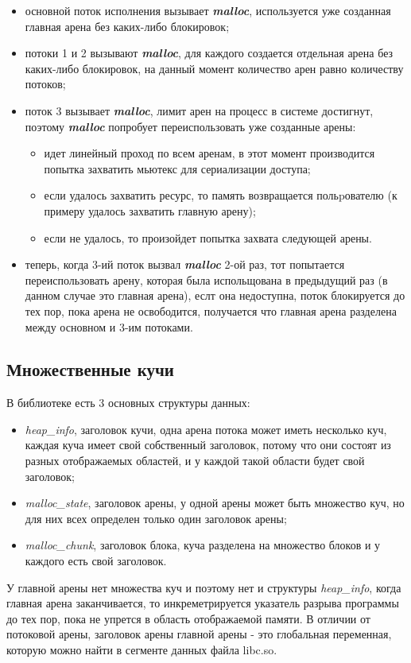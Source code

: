 \begin{itemize}
	\item основной поток исполнения вызывает \textbf{\textit{malloc}}, используется уже созданная главная арена без каких-либо блокировок;
	\item потоки 1 и 2 вызывают \textbf{\textit{malloc}}, для каждого создается отдельная арена без каких-либо блокировок, на данный момент количество арен равно количеству потоков;
	\item поток 3 вызывает \textbf{\textit{malloc}}, лимит арен на процесс в системе достигнут, поэтому \textbf{\textit{malloc}} попробует переиспользовать уже созданные арены:
	\begin{itemize}
		\item идет линейный проход по всем аренам, в этот момент производится попытка захватить мьютекс для сериализации доступа;
		\item если удалось захватить ресурс, то память возвращается польpователю (к примеру удалось захватить главную арену);
		\item если не удалось, то произойдет попытка захвата следующей арены.
	\end{itemize}
	\item теперь, когда 3-ий поток вызвал \textbf{\textit{malloc}} 2-ой раз, тот попытается переиспользовать арену, которая была испольщована в предыдущий раз (в данном случае это главная арена), еслт она недоступна, поток блокируется до тех пор, пока арена не освободится, получается что главная арена разделена между основном и 3-им потоками.
\end{itemize}

\subsection{Множественные кучи}
В библиотеке есть 3 основных структуры данных:
\begin{itemize}
	\item \textit{heap\_info}, заголовок кучи, одна арена потока может иметь несколько куч, каждая куча имеет свой собственный заголовок, потому что они состоят из разных отображаемых областей, и у каждой такой области будет свой заголовок;
	\item \textit{malloc\_state}, заголовок арены, у одной арены может быть множество куч, но для них всех определен только один заголовок арены;
	\item \textit{malloc\_chunk}, заголовок блока, куча разделена на множество блоков и у каждого есть свой заголовок.
\end{itemize}
У главной арены нет множества куч и поэтому нет и структуры \textit{heap\_info}, когда главная арена заканчивается, то инкреметрируется указатель разрыва программы до тех пор, пока не упрется в область отображаемой памяти. В отличии от потоковой арены, заголовок арены главной арены - это глобальная переменная, которую можно найти в сегменте данных файла libc.so.

